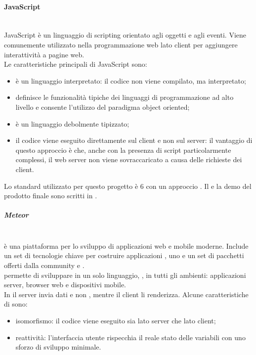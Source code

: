 \paragraph{JavaScript}\mbox{}\\
JavaScript è un linguaggio di scripting orientato agli oggetti e agli eventi. Viene comunemente utilizzato nella programmazione web lato client per aggiungere interattività a pagine web.\\
Le caratteristiche principali di JavaScript sono:
\begin{itemize}
	\item è un linguaggio interpretato: il codice non viene compilato, ma interpretato;
	\item definisce le funzionalità tipiche dei linguaggi di programmazione ad alto livello e consente l'utilizzo del paradigma object oriented;
	\item è un linguaggio debolmente tipizzato;
	\item il codice viene eseguito direttamente sul client e non sul server: il vantaggio di questo approccio è che, anche con la presenza di script particolarmente complessi, il web server non viene sovraccaricato a causa delle richieste dei client.
\end{itemize}
Lo standard utilizzato per questo progetto è  6 con un approccio .
Il  e la demo del prodotto finale sono scritti in .

\subparagraph{Meteor}\mbox{}\\
 è una piattaforma   per lo sviluppo di applicazioni web e mobile moderne. Include un set di tecnologie chiave per costruire applicazioni , uno  e un set di pacchetti offerti dalla community  e .\\
 permette di sviluppare in un solo linguaggio, , in tutti gli ambienti: applicazioni server, browser web e dispositivi mobile.\\
In  il server invia dati e non , mentre il client li renderizza.
Alcune caratteristiche di  sono:
\begin{itemize}
	\item isomorfismo: il codice viene eseguito sia lato server che lato client;
	\item reattività: l'interfaccia utente rispecchia il reale stato delle variabili con uno sforzo di sviluppo minimale.
\end{itemize}

